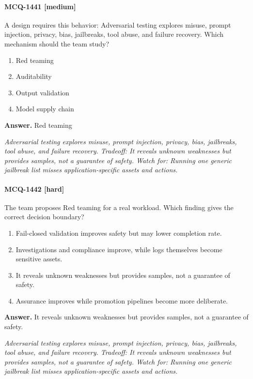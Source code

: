 \paragraph{MCQ-1441 [medium]} A design requires this behavior: Adversarial testing explores misuse, prompt injection, privacy, bias, jailbreaks, tool abuse, and failure recovery. Which mechanism should the team study?
\begin{enumerate}[label=\Alph*.]
\item Red teaming
\item Auditability
\item Output validation
\item Model supply chain
\end{enumerate}
\noindent\textbf{Answer.} Red teaming
\par\textit{Adversarial testing explores misuse, prompt injection, privacy, bias, jailbreaks, tool abuse, and failure recovery. Tradeoff: It reveals unknown weaknesses but provides samples, not a guarantee of safety. Watch for: Running one generic jailbreak list misses application-specific assets and actions.}
\paragraph{MCQ-1442 [hard]} The team proposes Red teaming for a real workload. Which finding gives the correct decision boundary?
\begin{enumerate}[label=\Alph*.]
\item Fail-closed validation improves safety but may lower completion rate.
\item Investigations and compliance improve, while logs themselves become sensitive assets.
\item It reveals unknown weaknesses but provides samples, not a guarantee of safety.
\item Assurance improves while promotion pipelines become more deliberate.
\end{enumerate}
\noindent\textbf{Answer.} It reveals unknown weaknesses but provides samples, not a guarantee of safety.
\par\textit{Adversarial testing explores misuse, prompt injection, privacy, bias, jailbreaks, tool abuse, and failure recovery. Tradeoff: It reveals unknown weaknesses but provides samples, not a guarantee of safety. Watch for: Running one generic jailbreak list misses application-specific assets and actions.}
